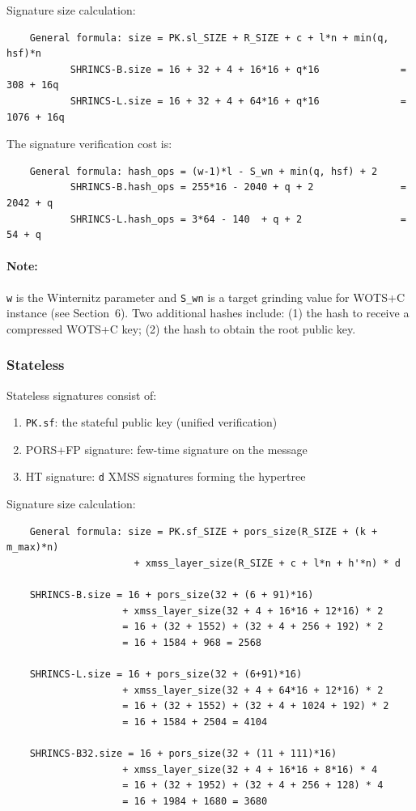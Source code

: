 Signature size calculation: 
\begin{verbatim}
    General formula: size = PK.sl_SIZE + R_SIZE + c + l*n + min(q, hsf)*n 
           SHRINCS-B.size = 16 + 32 + 4 + 16*16 + q*16              = 308 + 16q
           SHRINCS-L.size = 16 + 32 + 4 + 64*16 + q*16              = 1076 + 16q
\end{verbatim}

The signature verification cost is:
\begin{verbatim}
    General formula: hash_ops = (w-1)*l - S_wn + min(q, hsf) + 2 
           SHRINCS-B.hash_ops = 255*16 - 2040 + q + 2               = 2042 + q
           SHRINCS-L.hash_ops = 3*64 - 140  + q + 2                 = 54 + q
\end{verbatim}

\paragraph{Note:} \texttt{w} is the Winternitz parameter and \texttt{S\_wn} is a target grinding value for WOTS+C instance (see Section~6). Two additional hashes include: (1) the hash to receive a compressed WOTS+C key; (2) the hash to obtain the root public key.

\subsubsection{Stateless}
Stateless signatures consist of:
\begin{enumerate}
    \item \texttt{PK.sf}: the stateful public key (unified verification)
    \item PORS+FP signature: few-time signature on the message
    \item HT signature: \texttt{d} XMSS signatures forming the hypertree
\end{enumerate}

Signature size calculation: 
\begin{verbatim}
    General formula: size = PK.sf_SIZE + pors_size(R_SIZE + (k + m_max)*n)
                      + xmss_layer_size(R_SIZE + c + l*n + h'*n) * d

    SHRINCS-B.size = 16 + pors_size(32 + (6 + 91)*16)
                    + xmss_layer_size(32 + 4 + 16*16 + 12*16) * 2
                    = 16 + (32 + 1552) + (32 + 4 + 256 + 192) * 2
                    = 16 + 1584 + 968 = 2568

    SHRINCS-L.size = 16 + pors_size(32 + (6+91)*16)
                    + xmss_layer_size(32 + 4 + 64*16 + 12*16) * 2
                    = 16 + (32 + 1552) + (32 + 4 + 1024 + 192) * 2
                    = 16 + 1584 + 2504 = 4104

    SHRINCS-B32.size = 16 + pors_size(32 + (11 + 111)*16)
                    + xmss_layer_size(32 + 4 + 16*16 + 8*16) * 4
                    = 16 + (32 + 1952) + (32 + 4 + 256 + 128) * 4
                    = 16 + 1984 + 1680 = 3680
\end{verbatim}

